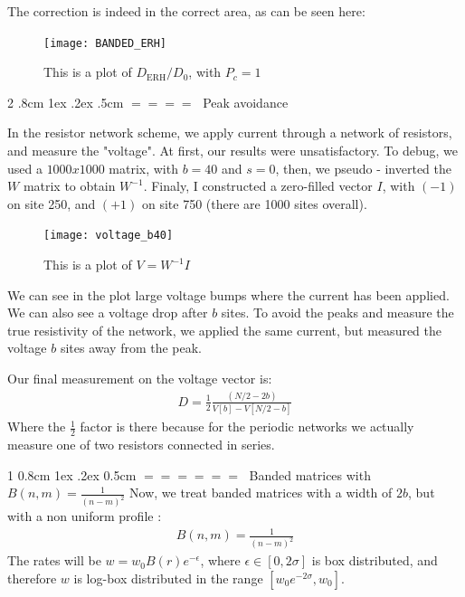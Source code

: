 \documentclass[onecolumn,fleqn,notitlepage,secnumarabic]{revtex4}
\makeatletter
\def\section{%
  \@startsection
    {section}%
    {1}%
    {\z@}%
    {0.8cm \@plus1ex \@minus .2ex}%
    {0.5cm}%
    {\Large\bf $=\!=\!=\!=\!=\!=\;$}%
}%
\def\subsection{%
  \@startsection
    {subsection}%
    {2}%
    {\z@}%
    {.8cm \@plus1ex \@minus .2ex}%
    {.5cm}%
    {\normalfont\small\bfseries$=\!=\!=\!=\;$}%
}%
\makeatother
\begin{document}
The correction is indeed in the correct area, as can be seen here:
\begin{figure}[H]
\texttt{[image: BANDED\_ERH]}
\caption{This is a plot of $D_\textrm{ERH}/D_0$, with $P_c=1$}
\end{figure}


\subsection{Peak avoidance}

In the resistor network scheme, we apply current through a network of resistors, and measure the "voltage". At first, our results were unsatisfactory. To debug, we used a $1000x1000$ matrix, with $b=40$ and $s=0$, then, we pseudo - inverted the $W$ matrix to obtain $W^{-1}$. 
Finaly, I constructed a zero-filled vector $I$, with $(-1)$ on site 250, and $(+1)$ on site 750 (there are 1000 sites overall).
\begin{figure}[H]
\texttt{[image: voltage\_b40]}
\caption{This is a plot of $V=W^{-1}I$}
\end{figure} 
We can see in the plot large voltage bumps where the current has been applied. We can also see a voltage drop after $b$ sites. To avoid the peaks and measure the true resistivity of the network, we applied the same current, but measured the voltage $b$ sites away from the peak.

Our final measurement on the voltage vector is:
\begin{align}
D = \frac{1}{2}\frac{(N/2-2b)}{V[b] - V[N/2-b]}
\end{align}
Where the $\frac{1}{2}$ factor is there because for the periodic networks we actually measure one of two resistors connected in series.

\section{Banded matrices with $B(n,m) = \frac{1}{(n-m)^2}$}\label{sec:OOS}
Now, we treat banded matrices with a width of $2b$, but with a non uniform profile :
\begin{align}
   B(n,m) = \frac{1}{(n-m)^2}
\end{align}
The rates will be $w = w_0B(r)e^{-\epsilon}$, where $\epsilon \in [0,2\sigma]$ is box distributed,
and therefore $w$ is log-box distributed in the range $[w_0e^{-2\sigma}, w_0]$.

\end{document}
